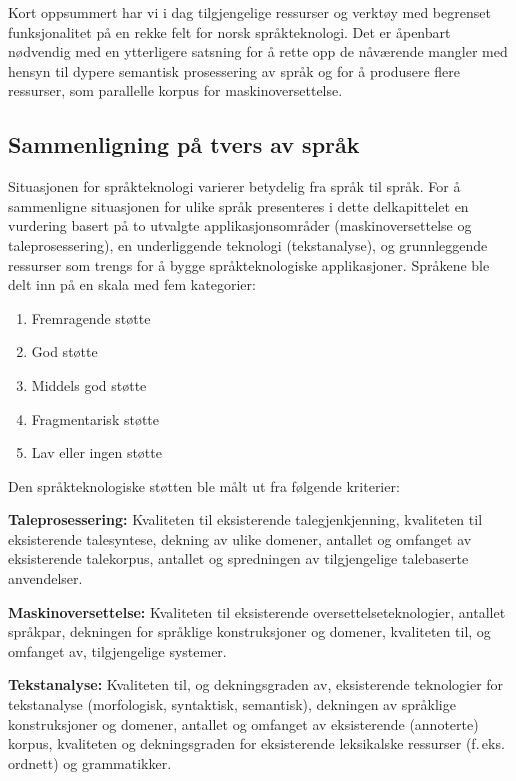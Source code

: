 \begin{multicols}{2}
Kort oppsummert har vi i dag tilgjengelige ressurser og verktøy med begrenset funksjonalitet på en rekke felt for norsk språkteknologi.
Det er åpenbart nødvendig med en ytterligere satsning for å rette opp de nåværende mangler med hensyn til dypere semantisk prosessering av språk og for å produsere flere ressurser, som parallelle korpus for maskinoversettelse.

\subsection{Sammenligning på tvers av språk}

Situasjonen for språkteknologi varierer betydelig fra språk til språk. For å sammenligne situasjonen for ulike språk presenteres i dette delkapittelet en vurdering basert på to utvalgte applikasjonsområder (maskinoversettelse og taleprosessering), en underliggende teknologi (tekstanalyse), og grunnleggende ressurser som trengs for å bygge språkteknologiske applikasjoner. Språkene ble delt inn på en skala med fem kategorier:

\begin{enumerate}
\item Fremragende støtte
\item God støtte
\item Middels god støtte 
\item Fragmentarisk støtte
\item Lav eller ingen støtte
\end{enumerate}

Den språkteknologiske støtten ble målt ut fra følgende kriterier:

\textbf{Taleprosessering:} Kvaliteten til eksisterende talegjenkjenning, kvaliteten til eksisterende talesyntese, dekning av ulike domener, antallet og omfanget av eksisterende talekorpus, antallet og spredningen av tilgjengelige talebaserte anvendelser.

\textbf{Maskinoversettelse:} Kvaliteten til eksisterende oversettelseteknologier, antallet språkpar, dekningen for språklige konstruksjoner og domener, kvaliteten til, og omfanget av, tilgjengelige systemer.

\textbf{Tekstanalyse:} Kvaliteten til, og dekningsgraden av, eksisterende teknologier for tekstanalyse (morfologisk, syntaktisk, semantisk), dekningen av språklige konstruksjoner og domener, antallet og omfanget av eksisterende (annoterte) korpus, kvaliteten og dekningsgraden for eksisterende leksikalske ressurser (f.\,eks. ordnett) og grammatikker.


\end{multicols}
